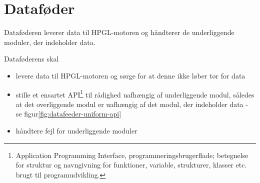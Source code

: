 \section[Dataføder (med SPI og SD-/MMC-kort)]{Dataføder}


Dataføderen leverer data til HPGL-motoren og håndterer de
underliggende moduler, der indeholder data.

Dataføderens skal
\begin{itemize} \firmlist
\item levere data til HPGL-motoren og sørge for at denne ikke løber
  tør for data
\item stille et ensartet API\footnote{Application Programming
    Interface, programmeringsbrugerflade; betegnelse for struktur og
    navngivning for funktioner, variable, strukturer, klasser
    etc. brugt til programudvikling.} til rådighed uafhængig af underliggende modul,
  således at det overliggende modul er uafhængig af det modul, der
  indeholder data - se figur\vref{fig:datafeeder-uniform-api}
\item håndtere fejl for underliggende moduler
\end{itemize}


